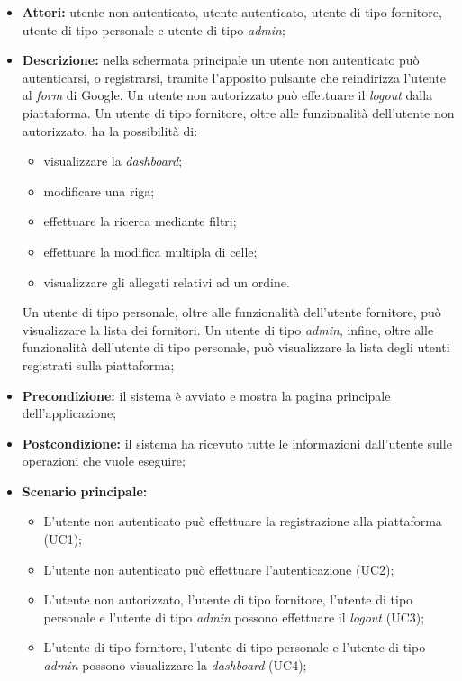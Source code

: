 \begin{itemize}
  \item \textbf{Attori:} utente non autenticato, utente autenticato, utente di tipo fornitore, utente di tipo personale e utente di tipo \emph{admin};
  \item \textbf{Descrizione:} nella schermata principale un utente non autenticato può autenticarsi, o registrarsi, tramite l'apposito pulsante che reindirizza l'utente al \emph{form} di Google. Un utente non autorizzato può effettuare il \emph{logout} dalla piattaforma. Un utente di tipo fornitore, oltre alle funzionalità dell'utente non autorizzato, ha la possibilità di:\
    \begin{itemize}
      \item visualizzare la \emph{dashboard};
      \item modificare una riga;
      \item effettuare la ricerca mediante filtri;
      \item effettuare la modifica multipla di celle;
      \item visualizzare gli allegati relativi ad un ordine.
    \end{itemize}
    Un utente di tipo personale, oltre alle funzionalità dell'utente fornitore, può visualizzare la lista dei fornitori. Un utente di tipo \emph{admin}, infine, oltre alle funzionalità dell'utente di tipo personale, può visualizzare la lista degli utenti registrati sulla piattaforma;
  \item \textbf{Precondizione:} il sistema è avviato e mostra la pagina principale dell'applicazione;
  \item \textbf{Postcondizione:} il sistema ha ricevuto tutte le informazioni dall'utente sulle operazioni che vuole eseguire;
  \item \textbf{Scenario principale:} 
    \begin{itemize}
      \item L'utente non autenticato può effettuare la registrazione alla piattaforma (UC1);
      \item L'utente non autenticato può effettuare l'autenticazione (UC2);
      \item L'utente non autorizzato, l'utente di tipo fornitore, l'utente di tipo personale e l'utente di tipo \emph{admin} possono effettuare il \emph{logout} (UC3);
      \item L'utente di tipo fornitore, l'utente di tipo personale e l'utente di tipo \emph{admin} possono visualizzare la \emph{dashboard} (UC4);

\end{itemize}
\end{itemize}
